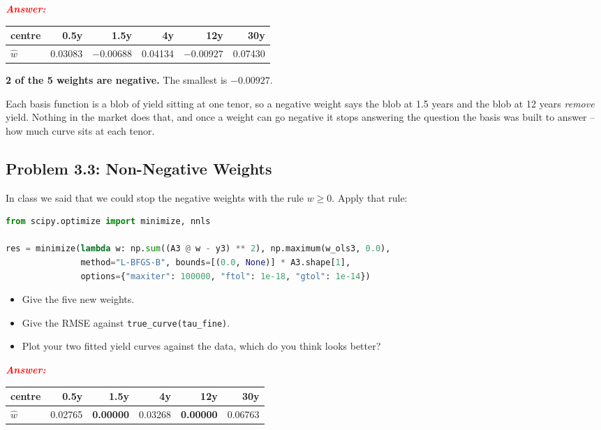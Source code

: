 \documentclass[11pt, letterpaper]{article}
\newcommand{\subproblem}[1]{\subsection*{Problem #1}}
\newcommand{\answer}{\textbf{\textit{\textcolor{red}{Answer:}}}}
\begin{document}
\answer

\begin{center}
\begin{tabular}{lrrrrr}
\toprule
centre & 0.5y & 1.5y & 4y & 12y & 30y \\
\midrule
$\hat w$ & 0.03083 & $\mathbf{-0.00688}$ & 0.04134 & $\mathbf{-0.00927}$ & 0.07430 \\
\bottomrule
\end{tabular}
\end{center}

\textbf{2 of the 5 weights are negative.} The smallest is $-0.00927$.

Each basis function is a blob of yield sitting at one tenor, so a negative weight says the blob at
1.5 years and the blob at 12 years \textit{remove} yield. Nothing in the market does that, and once
a weight can go negative it stops answering the question the basis was built to answer -- how much
curve sits at each tenor.


\subproblem{3.3: Non-Negative Weights}
In class we said that we could stop the negative weights with the rule $w \ge 0$. Apply that rule:

    \begin{lstlisting}[language=Python]
from scipy.optimize import minimize, nnls

res = minimize(lambda w: np.sum((A3 @ w - y3) ** 2), np.maximum(w_ols3, 0.0),
               method="L-BFGS-B", bounds=[(0.0, None)] * A3.shape[1],
               options={"maxiter": 100000, "ftol": 1e-18, "gtol": 1e-14})\end{lstlisting}

\begin{itemize}
    \item Give the five new weights.
    \item Give the RMSE against \texttt{true\_curve(tau\_fine)}.
    \item Plot your two fitted yield curves against the data, which do you think looks better?
\end{itemize}

\answer

\begin{center}
\begin{tabular}{lrrrrr}
\toprule
centre & 0.5y & 1.5y & 4y & 12y & 30y \\
\midrule
$\hat w$ & 0.02765 & \textbf{0.00000} & 0.03268 & \textbf{0.00000} & 0.06763 \\
\bottomrule
\end{tabular}
\end{center}
\end{document}
